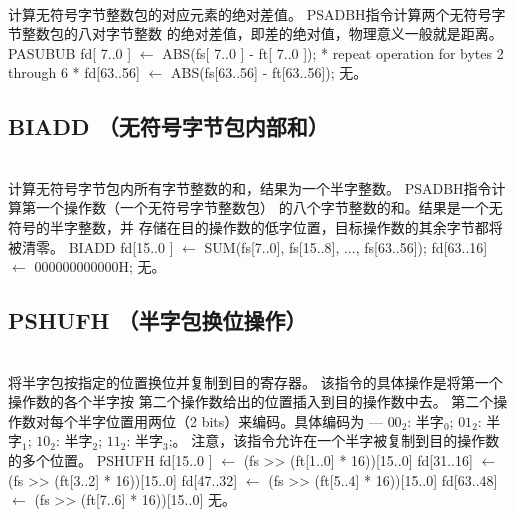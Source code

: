 \begin{instructionblk}
   \\
  {计算无符号字节整数包的对应元素的绝对差值。}
  {PSADBH指令计算两个无符号字节整数包的八对字节整数
  的绝对差值，即差的绝对值，物理意义一般就是距离。}
  {PASUBUB \narrownewline
  fd[ 7..0 ] $\leftarrow$ ABS(fs[ 7..0 ] - ft[ 7..0 ]); \narrownewline
  * repeat operation for bytes 2 through 6 * \narrownewline
  fd[63..56] $\leftarrow$ ABS(fs[63..56] - ft[63..56]);}
  {无。}
\end{instructionblk}

\subsection{BIADD （无符号字节包内部和）}

\begin{instructionblk}
   \\
  {计算无符号字节包内所有字节整数的和，结果为一个半字整数。}
  {PSADBH指令计算第一个操作数（一个无符号字节整数包）
  的八个字节整数的和。结果是一个无符号的半字整数，并
  存储在目的操作数的低字位置，目标操作数的其余字节都将
  被清零。}
  {BIADD \narrownewline
  fd[15..0 ] $\leftarrow$ SUM(fs[7..0], fs[15..8], ..., fs[63..56]); \narrownewline
  fd[63..16] $\leftarrow$ 000000000000H;}
  {无。}
\end{instructionblk}

\subsection{PSHUFH （半字包换位操作）}

\begin{instructionblk}
   \\
  {将半字包按指定的位置换位并复制到目的寄存器。}
  {该指令的具体操作是将第一个操作数的各个半字按
  第二个操作数给出的位置插入到目的操作数中去。
  第二个操作数对每个半字位置用两位（2 bits）来编码。具体编码为 --- $00_2$:
  半字$_0$; $01_2$: 半字$_1$; $10_2$: 半字$_2$; $11_2$: 半字$_3$;。
  注意，该指令允许在一个半字被复制到目的操作数的多个位置。}
  {PSHUFH \narrownewline
  fd[15..0 ] $\leftarrow$ (fs >> (ft[1..0] * 16))[15..0] \narrownewline
  fd[31..16] $\leftarrow$ (fs >> (ft[3..2] * 16))[15..0] \narrownewline
  fd[47..32] $\leftarrow$ (fs >> (ft[5..4] * 16))[15..0] \narrownewline
  fd[63..48] $\leftarrow$ (fs >> (ft[7..6] * 16))[15..0]}
  {无。}
\end{instructionblk}


